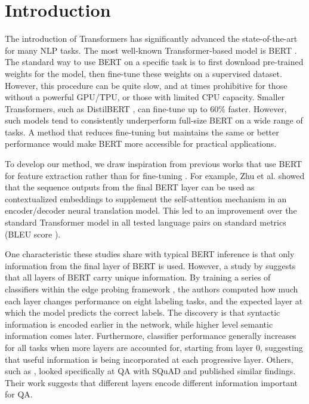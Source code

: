 \section{Introduction}


The introduction of Transformers \cite{Vaswani2017} has significantly advanced the state-of-the-art for many NLP tasks. The most well-known Transformer-based model is BERT \cite{Devlin2019}. The standard way to use BERT on a specific task is to first download pre-trained weights for the model, then fine-tune these weights on a supervised dataset. However, this procedure can be quite slow, and at times prohibitive for those without a powerful GPU/TPU, or those with limited CPU capacity. Smaller Transformers, such as DistilBERT \cite{sanh2019distilbert}, can fine-tune up to 60\% faster. However, such models tend to consistently underperform full-size BERT on a wide range of tasks. A method that reduces fine-tuning but maintains the same or better performance would make BERT more accessible for practical applications.

To develop our method, we draw inspiration from previous works that use BERT for feature extraction rather than for fine-tuning \citep{Zhu2020IncorporatingBI, Chen_2020}. For example, Zhu et al. showed that the sequence outputs from the final BERT layer can be used as contextualized embeddings to supplement the self-attention mechanism in an encoder/decoder neural translation model. This led to an improvement over the standard Transformer model in all tested language pairs on standard metrics (BLEU score \cite{Papineni02bleu:a}).

One characteristic these studies share with typical BERT inference is that only information from the final layer of BERT is used. However, a study by \cite{tenney-etal-2019-bert} suggests that all layers of BERT carry unique information. By training a series of classifiers within the edge probing framework \cite{DBLP:journals/corr/abs-1905-06316}, the authors computed how much each layer changes performance on eight labeling tasks, and the expected layer at which the model predicts the correct labels. The discovery is that syntactic information is encoded earlier in the network, while higher level semantic information comes later. Furthermore, classifier performance generally increases for all tasks when more layers are accounted for, starting from layer 0, suggesting that useful information is being incorporated at each progressive layer. Others, such as \cite{van_Aken_2019}, looked specifically at QA with SQuAD and published similar findings. Their work suggests that different layers encode different information important for QA.

